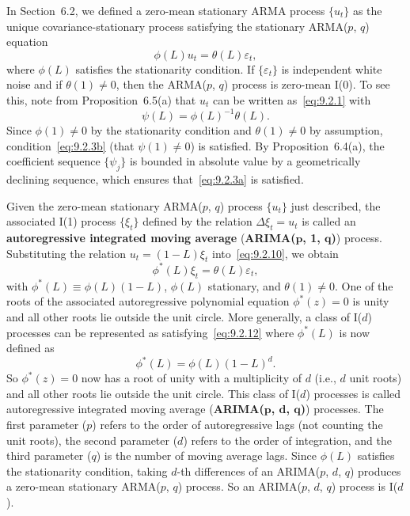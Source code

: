 In Section~6.2, we defined a zero-mean stationary ARMA process $\{u_t\}$ as the
unique covariance-stationary process satisfying the stationary ARMA($p$, $q$)
equation
\begin{equation}
\label{eq:9.2.10}
\phi(L) u_t = \theta(L) \varepsilon_t,
\end{equation}
where $\phi(L)$ satisfies the stationarity condition. If $\{\varepsilon_t\}$ is independent white noise
and if $\theta(1) \neq 0$, then the ARMA($p$, $q$) process is zero-mean I(0). To see this, note
from Proposition~6.5(a) that $u_t$ can be written as~\eqref{eq:9.2.1} with
\begin{equation}
\label{eq:9.2.11}
\psi(L) = \phi(L)^{-1} \theta(L).
\end{equation}
Since $\phi(1) \neq 0$ by the stationarity condition and $\theta(1) \neq 0$ by assumption, condition~\eqref{eq:9.2.3b} (that $\psi(1) \neq 0$) is satisfied. By Proposition~6.4(a), the coefficient
sequence $\{\psi_j\}$ is bounded in absolute value by a geometrically declining sequence,
which ensures that~\eqref{eq:9.2.3a} is satisfied.

Given the zero-mean stationary ARMA($p$, $q$) process $\{u_t\}$ just described, the
associated I(1) process $\{\xi_t\}$ defined by the relation $\Delta \xi_t = u_t$ is called an \textbf{autoregressive integrated moving average} (\textbf{ARIMA($\bm{p}$, 1, $\bm{q}$)}) process. Substituting the
relation $u_t = (1 - L)\xi_t$ into~\eqref{eq:9.2.10}, we obtain
\begin{equation}
\label{eq:9.2.12}
\phi^*(L) \xi_t = \theta(L) \varepsilon_t,
\end{equation}
with $\phi^*(L) \equiv \phi(L)(1 - L)$, $\phi(L)$ stationary, and $\theta(1) \neq 0$. One of the roots of
the associated autoregressive polynomial equation $\phi^*(z) = 0$ is unity and all other
roots lie outside the unit circle. More generally, a class of I($d$) processes can be
represented as satisfying~\eqref{eq:9.2.12} where $\phi^*(L)$ is now defined as
\begin{equation}
\label{eq:9.2.13}
\phi^*(L) = \phi(L)(1 - L)^d.
\end{equation}
So $\phi^*(z) = 0$ now has a root of unity with a multiplicity of $d$ (i.e., $d$ unit roots) and
all other roots lie outside the unit circle. This class of I($d$) processes is called autoregressive integrated moving average (\textbf{ARIMA($\bm{p}$, $\bm{d}$, $\bm{q}$)}) processes. The first
parameter ($p$) refers to the order of autoregressive lags (not counting the unit
roots), the second parameter ($d$) refers to the order of integration, and the third
parameter ($q$) is the number of moving average lags. Since $\phi(L)$ satisfies the
stationarity condition, taking $d$-th differences of an ARIMA($p$, $d$, $q$) produces a
zero-mean stationary ARMA($p$, $q$) process. So an ARIMA($p$, $d$, $q$) process is
I($d$).

